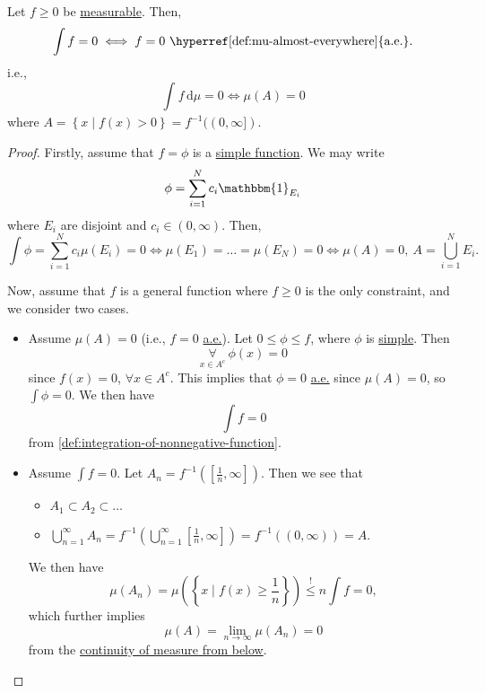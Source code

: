 \begin{proposition}\label{prop:lec12-1}
	Let \(f\geq 0\) be \hyperref[def:measurable-function]{measurable}. Then,
	\[
		\int f = 0 \iff f = 0\text{ \hyperref[def:mu-almost-everywhere]{a.e.}}.
	\]
	i.e.,
	\[
		\int_{}^{} f \,\mathrm{d}\mu = 0 \iff \mu (A) = 0
	\]
	where \(A = \left\{x \mid f(x)>0\right\} = f^{-1} ((0, \infty ])\).
\end{proposition}
\begin{proof}
	Firstly, assume that \(f = \phi \) is a \hyperref[def:simple-function]{simple function}. We may write
	\[
		\phi = \sum_{i=1}^{N} c_{i}\mathbbm{1}_{E_{i}}
	\]
	where \(E_{i}\) are disjoint and \(c_{i}\in(0, \infty )\). Then,
	\[
		\int \phi = \sum_{i=1}^{N} c_{i}\mu (E_{i}) = 0
		\iff \mu (E_1) = \dots = \mu (E_{N}) = 0
		\iff \mu (A) = 0,\ A = \bigcup_{i=1}^{N} E_{i}.
	\]

	Now, assume that \(f\) is a general function where \(f\geq 0\) is the only constraint, and we consider two cases.
	\begin{itemize}
		\item Assume \(\mu (A) = 0\) (i.e., \(f = 0\) \hyperref[def:mu-almost-everywhere]{a.e.}). Let \(0\leq \phi \leq f\), where \(\phi\) is \hyperref[def:simple-function]{simple}. Then
		      \[
			      \underset{x\in A^{c} }{\forall }\ \phi (x) = 0
		      \]
		      since \(f(x) = 0\), \(\forall x\in A^{c} \). This implies that \(\phi = 0\) \hyperref[def:mu-almost-everywhere]{a.e.} since \(\mu (A) = 0\), so \(\int \phi =0\). We then have
		      \[
			      \int f = 0
		      \]
		      from \autoref{def:integration-of-nonnegative-function}.
		\item Assume \(\int f = 0\). Let \(A_{n} = f^{-1} \left(\left[\frac{1}{n}, \infty \right]\right)\). Then we see that
		      \begin{itemize}
			      \item \(A_1\subset A_2\subset \dots  \)
			      \item \(\bigcup_{n=1}^{\infty} A_{n} = f^{-1} \left(\bigcup_{n=1}^{\infty} \left[\frac{1}{n}, \infty \right]\right) = f^{-1} ((0, \infty )) = A\).
		      \end{itemize}
		      We then have
		      \[
			      \mu (A_{n}) = \mu \left(\left\{x \mid f(x)\geq \frac{1}{n}\right\}\right) \overset{\hyperref[lma:Markov-inequality]{!}}{\leq }n \int f = 0,
		      \]
		      which further implies
		      \[
			      \mu (A) = \lim_{n \to \infty} \mu (A_{n}) = 0
		      \]
		      from the \hyperref[thm:measure-space-continuity-from-below]{continuity of measure from below}.
	\end{itemize}
\end{proof}

